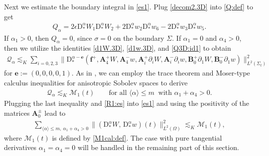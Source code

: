 \documentclass[twoside,11pt]{article}
\numberwithin{equation}{section}
\def\p{\partial}
\begin{document}
Next we estimate the boundary integral in \eqref{es1}.
Plug \eqref{decom2.3D} into \eqref{Q:def} to get
\begin{align} \label{Q3D:id1}
	{Q}_{\alpha} =
	2\epsilon\mathrm{D}_*^{\alpha}W_1\mathrm{D}_*^{\alpha}W_2
	+2\mathrm{D}_*^{\alpha}w_2\mathrm{D}_*^{\alpha}w_6
	-2\mathrm{D}_*^{\alpha}w_3\mathrm{D}_*^{\alpha}w_5.
\end{align}
If $\alpha_1>0$, then ${Q}_{\alpha}=0$, since $\sigma=0$ on the boundary $\Sigma$.
If $\alpha_1=0$ and $\alpha_4>0$, then we utilize the identities \eqref{d1W.3D}, \eqref{d1w.3D}, and \eqref{Q3D:id1} to obtain
	\begin{align}
		\mathcal{Q}_{\alpha}\lesssim_K
		\sum_{i=0,2,3}\|\mathrm{D}_*^{\alpha-{\mathbf{e}}} (\bm{f}^+,  {\bm{A}}_4^+ W,{\bm{A}}_4^- w,{\bm{A}}_i^+\p_i W,{\bm{A}}_i^-\p_i w,{\bm{B}}_0^{+}\p_1W,{\bm{B}}_0^{-}\p_1w)\|_{L^2(\Sigma_t)}^2	 \nonumber
	\end{align}
	for ${\mathbf{e}}:=(0, 0, 0, 0, 1).  $
	As in \cite[\S\,3.5.3]{TW22cMR4506578}, we can employ the trace theorem and Moser-type calculus inequalities for anisotropic Sobolev spaces to derive
\begin{align}
\mathcal{Q}_{\alpha}\lesssim_K \mathcal{M}_1(t)
\qquad \textrm{for all }  \langle \alpha \rangle \leq m \ \textrm{ with }
\alpha_1+\alpha_4>0.
\nonumber
\end{align}
Plugging the last inequality and \eqref{R1:es} into \eqref{es1} and using the positivity of the matrices $\bm{A}_0^{\pm}$ lead to
\begin{align}
	\sum_{\langle \alpha\rangle \leq m,\
	\alpha_1+\alpha_4>0}	\|(\mathrm{D}_*^{\alpha}W,\, \mathrm{D}_*^{\alpha}w)(t)\|_{L^2(\Omega)}^2
	\lesssim_K  \mathcal{M}_1(t),
\label{es2}
\end{align}
where $\mathcal{M}_1(t)$ is defined by \eqref{M1cal:def}.	
The case with pure tangential derivatives $\alpha_1=\alpha_4=0$ will be handled in the remaining part of this section.	






\end{document}
